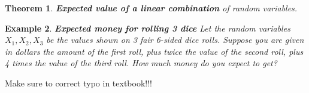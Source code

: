 \documentclass[12pt]{amsart}
\newtheorem{theorem}{Theorem}[section]
\newtheorem{example}[theorem]{Example}
\begin{document}
{\begin{theorem}{\textbf{Expected value of a linear combination} of random variables.}
\end{theorem}



%
%
%
%



\begin{example}  \textbf{Expected money for rolling 3 dice} \newline
Let the random variables $X_1, X_2, X_3$ be the values shown on 3 fair 6-sided dice rolls. \newline 
Suppose you are given in dollars the amount of the first roll, plus twice the value of the second roll, plus 4 times the value of the third roll. \newline 
How much money do you expect to get?  \newline 



\end{example} 

\vspace{2cm}



\newpage

Make sure to correct typo in textbook!!!

\vspace{2cm}

}
\end{document}
